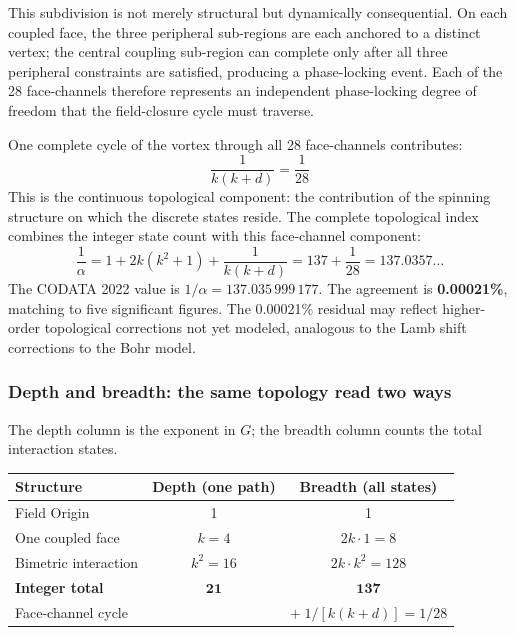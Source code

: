 \documentclass[aps,prd,preprint,superscriptaddress,showpacs,preprintnumbers,amsmath,amssymb,nofootinbib]{revtex4-2}
\begin{document}
This subdivision is not merely structural but dynamically consequential. On each coupled face, the three peripheral sub-regions are each anchored to a distinct vertex; the central coupling sub-region can complete only after all three peripheral constraints are satisfied, producing a phase-locking event. Each of the 28 face-channels therefore represents an independent phase-locking degree of freedom that the field-closure cycle must traverse.

One complete cycle of the vortex through all 28 face-channels contributes:
\begin{equation*}
\frac{1}{k(k+d)} = \frac{1}{28}
\end{equation*}
This is the continuous topological component: the contribution of the spinning structure on which the discrete states reside. The complete topological index combines the integer state count with this face-channel component:
\begin{equation}
\frac{1}{\alpha} = 1 + 2k(k^2 + 1) + \frac{1}{k(k + d)} = 137 + \frac{1}{28} = 137.0357\ldots
\label{eq:alpha-breadth}
\end{equation}
The CODATA 2022 value is $1/\alpha = 137.035\,999\,177$. The agreement is \textbf{0.00021\%}, matching to five significant figures. The 0.00021\% residual may reflect higher-order topological corrections not yet modeled, analogous to the Lamb shift corrections to the Bohr model.

\subsubsection*{Depth and breadth: the same topology read two ways}

The depth column is the exponent in $G$; the breadth column counts the total interaction states.

\begin{center}
\renewcommand{\arraystretch}{1.4}
\begin{tabular}{lcc}
\hline
\textbf{Structure} & \textbf{Depth (one path)} & \textbf{Breadth (all states)} \\
\hline
Field Origin & 1 & 1 \\
One coupled face & $k = 4$ & $2k \cdot 1 = 8$ \\
Bimetric interaction & $k^2 = 16$ & $2k \cdot k^2 = 128$ \\
\hline
\textbf{Integer total} & $\mathbf{21}$ & $\mathbf{137}$ \\
Face-channel cycle & & $+ \; 1/[k(k{+}d)] = 1/28$ \\
\hline
\end{tabular}
\end{center}
\end{document}
